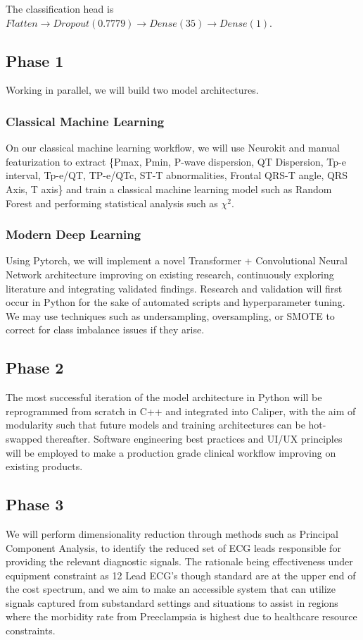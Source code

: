 \documentclass[sigconf,nonacm]{acmart}
\begin{document}
The classification head is \\
$Flatten \to Dropout(0.7779) \to Dense(35) \to Dense(1)$.

\subsection{Phase 1}
  Working in parallel, we will build two model architectures.

  \subsubsection{Classical Machine Learning}
On our classical machine learning workflow, we will use Neurokit and manual featurization to extract \{Pmax, Pmin, P-wave dispersion, QT Dispersion, Tp-e interval, Tp-e/QT, TP-e/QTc, ST-T abnormalities, Frontal QRS-T angle, QRS Axis, T axis\} and train a classical machine learning model such as Random Forest and performing statistical analysis such as $\chi^2$.

\subsubsection{Modern Deep Learning}
Using Pytorch, we will implement a novel Transformer + Convolutional Neural Network architecture improving on existing research, continuously exploring literature and integrating validated findings. Research and validation will first occur in Python for the sake of automated scripts and hyperparameter tuning. We may use techniques such as undersampling, oversampling, or SMOTE to correct for class imbalance issues if they arise.

  \subsection{Phase 2}
The most successful iteration of the model architecture in Python will be reprogrammed from scratch in C++ and integrated into Caliper, with the aim of modularity such that future models and training architectures can be hot-swapped thereafter. Software engineering best practices and UI/UX principles will be employed to make a production grade clinical workflow improving on existing products.

  \subsection{Phase 3}
We will perform dimensionality reduction through methods such as Principal Component Analysis, to identify the reduced set of ECG leads responsible for providing the relevant diagnostic signals. The rationale being effectiveness under equipment constraint as 12 Lead ECG's though standard are at the upper end of the cost spectrum, and we aim to make an accessible system that can utilize signals captured from substandard settings and situations to assist in regions where the morbidity rate from Preeclampsia is highest due to healthcare resource constraints.
\end{document}
